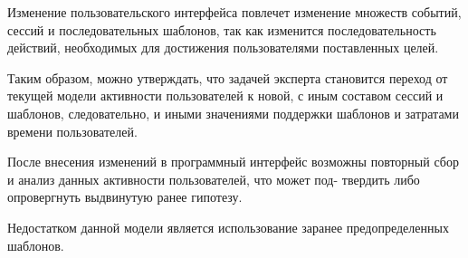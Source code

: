 Изменение пользовательского интерфейса повлечет изменение множеств событий, сессий и последовательных шаблонов, так как изменится
последовательность действий, необходимых для достижения пользователями поставленных целей.

Таким образом, можно утверждать, что задачей эксперта становится переход от текущей модели активности пользователей к новой, с иным составом сессий и шаблонов, следовательно, и иными значениями поддержки шаблонов и затратами времени пользователей.

После внесения изменений в программный интерфейс возможны повторный сбор и анализ данных активности пользователей, что может под-
твердить либо опровергнуть выдвинутую ранее гипотезу.

Недостатком данной модели является использование заранее предопределенных шаблонов.
